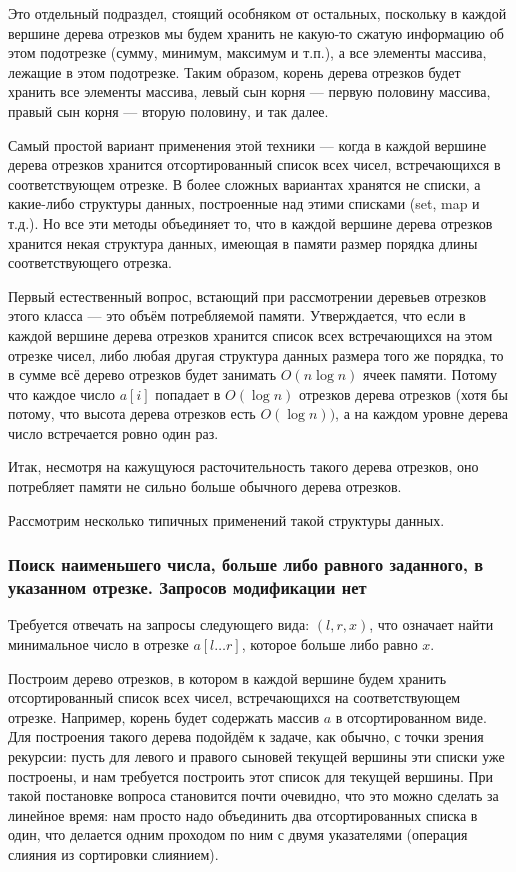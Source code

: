 Это отдельный подраздел, стоящий особняком от остальных, поскольку в каждой вершине дерева отрезков мы будем хранить не какую-то сжатую информацию об этом подотрезке (сумму, минимум, максимум и т.п.), а все элементы массива, лежащие в этом подотрезке. Таким образом, корень дерева отрезков будет хранить все элементы массива, левый сын корня — первую половину массива, правый сын корня — вторую половину, и так далее.

Самый простой вариант применения этой техники — когда в каждой вершине дерева отрезков хранится отсортированный список всех чисел, встречающихся в соответствующем отрезке. В более сложных вариантах хранятся не списки, а какие-либо структуры данных, построенные над этими списками (\rm set, \rm map и т.д.). Но все эти методы объединяет то, что в каждой вершине дерева отрезков хранится некая структура данных, имеющая в памяти размер порядка длины соответствующего отрезка.

Первый естественный вопрос, встающий при рассмотрении деревьев отрезков этого класса — это объём потребляемой памяти. Утверждается, что если в каждой вершине дерева отрезков хранится список всех встречающихся на этом отрезке чисел, либо любая другая структура данных размера того же порядка, то в сумме всё дерево отрезков будет занимать $O (n \log n)$ ячеек памяти. Потому что каждое число $a[i]$ попадает в $O (\log n)$ отрезков дерева отрезков (хотя бы потому, что высота дерева отрезков есть $O (\log n))$, а на каждом уровне дерева число встречается ровно один раз.

Итак, несмотря на кажущуюся расточительность такого дерева отрезков, оно потребляет памяти не сильно больше обычного дерева отрезков.

Рассмотрим несколько типичных применений такой структуры данных.

\subsubsection{Поиск наименьшего числа, больше либо равного заданного, в указанном отрезке. Запросов модификации нет}

Требуется отвечать на запросы следующего вида: $(l,r,x)$, что означает найти минимальное число в отрезке $a[l \ldots r]$, которое больше либо равно $x$.

Построим дерево отрезков, в котором в каждой вершине будем хранить отсортированный список всех чисел, встречающихся на соответствующем отрезке. Например, корень будет содержать массив $a$ в отсортированном виде. Для построения такого дерева подойдём к задаче, как обычно, с точки зрения рекурсии: пусть для левого и правого сыновей текущей вершины эти списки уже построены, и нам требуется построить этот список для текущей вершины. При такой постановке вопроса становится почти очевидно, что это можно сделать за линейное время: нам просто надо объединить два отсортированных списка в один, что делается одним проходом по ним с двумя указателями (операция слияния из сортировки слиянием).


